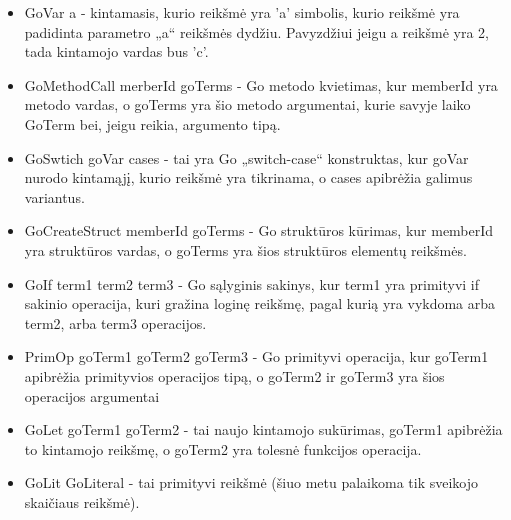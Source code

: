 \documentclass{VUMIFPSbakalaurinis}
\begin{document}
	\begin{itemize}
		\item GoVar a - kintamasis, kurio reikšmė yra 'a' simbolis, kurio reikšmė yra padidinta parametro „a“ reikšmės dydžiu. Pavyzdžiui jeigu a reikšmė yra 2, tada kintamojo vardas bus 'c'.
		\item GoMethodCall merberId goTerms - Go metodo kvietimas, kur memberId yra metodo vardas, o goTerms yra šio metodo argumentai, kurie savyje laiko GoTerm bei, jeigu reikia, argumento tipą.
		\item GoSwtich goVar cases - tai yra Go „switch-case“ konstruktas, kur goVar nurodo kintamąjį, kurio reikšmė yra tikrinama, o cases apibrėžia galimus variantus.
		\item GoCreateStruct memberId goTerms - Go struktūros kūrimas, kur memberId yra struktūros vardas, o goTerms yra šios struktūros elementų reikšmės.
		\item GoIf term1 term2 term3 - Go sąlyginis sakinys, kur term1 yra primityvi if sakinio operacija, kuri gražina loginę reikšmę, pagal kurią yra vykdoma arba term2, arba term3 operacijos.
		\item PrimOp goTerm1 goTerm2 goTerm3 - Go primityvi operacija, kur goTerm1 apibrėžia primityvios operacijos tipą, o goTerm2 ir goTerm3 yra šios operacijos argumentai
		\item GoLet goTerm1 goTerm2 - tai naujo kintamojo sukūrimas, goTerm1 apibrėžia to kintamojo reikšmę, o goTerm2 yra tolesnė funkcijos operacija.
		\item GoLit GoLiteral - tai primityvi reikšmė (šiuo metu palaikoma tik sveikojo skaičiaus reikšmė).
	\end{itemize}
\end{document}

